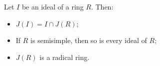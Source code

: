 Let $I$ be an ideal of a ring $R$. Then:
\begin{itemize}
\item[(i)] $J(I) = I \cap J(R)$;
\item[(ii)] If $R$ is semisimple, then so is every ideal of $R$;
\item[(iii)] $J(R)$ is a radical ring.
\end{itemize}

